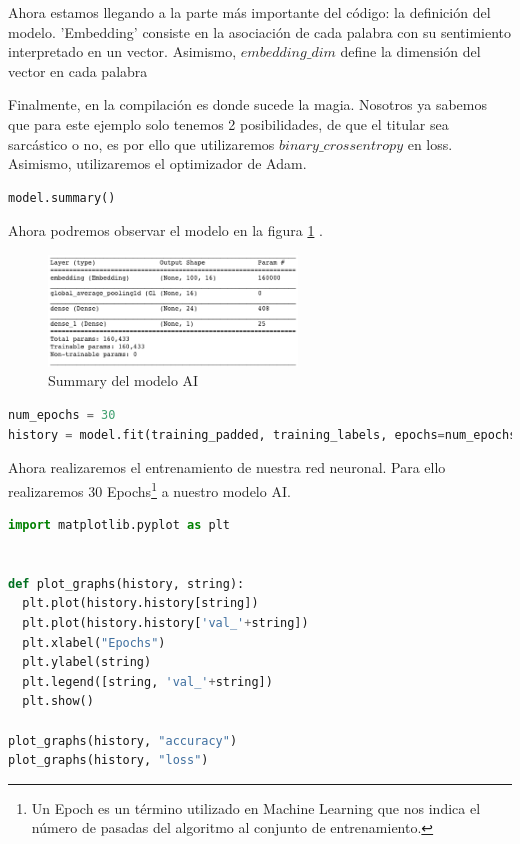 Ahora estamos llegando a la parte más importante del código: la definición del modelo. 'Embedding' consiste en la asociación de cada palabra con su sentimiento interpretado en un vector. Asimismo, $embedding\_dim$ define la dimensión del vector en cada palabra 

Finalmente, en la compilación es donde sucede la magia. Nosotros ya sabemos que para este ejemplo solo tenemos 2 posibilidades, de que el titular sea sarcástico o no, es por ello que utilizaremos $binary\_crossentropy$ en loss. Asimismo, utilizaremos el optimizador de Adam.

\begin{lstlisting}[style= mystyle, language=Python]
model.summary()
\end{lstlisting}
Ahora podremos observar el modelo en la figura \ref{fig:AI} .
\begin{figure}[h!]
    \centering
    \includegraphics[width=250px]{img/AI/s.png}
    \caption{Summary del modelo AI}
    \label{fig:AI}
\end{figure} 

\begin{lstlisting}[style= mystyle, language=Python]
num_epochs = 30
history = model.fit(training_padded, training_labels, epochs=num_epochs, validation_data=(testing_padded, testing_labels), verbose=2)
\end{lstlisting}

Ahora realizaremos el entrenamiento de nuestra red neuronal. Para ello realizaremos 30 Epochs\footnote{Un Epoch es un término utilizado en Machine Learning que nos indica el número de pasadas del algoritmo al conjunto de entrenamiento.} a nuestro modelo AI. 


\begin{lstlisting}[style= mystyle, language=Python]
import matplotlib.pyplot as plt


def plot_graphs(history, string):
  plt.plot(history.history[string])
  plt.plot(history.history['val_'+string])
  plt.xlabel("Epochs")
  plt.ylabel(string)
  plt.legend([string, 'val_'+string])
  plt.show()
  
plot_graphs(history, "accuracy")
plot_graphs(history, "loss")
\end{lstlisting}

